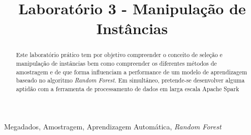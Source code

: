 \documentclass[conference]{IEEEtran}
\begin{document}
\title{Laboratório 3 - Manipulação de Instâncias}

\author{
\and
{}
\and
{}
}

\maketitle

\begin{abstract}
Este laboratório prático tem por objetivo compreender o conceito de seleção e manipulação de instâncias
bem como compreender os diferentes métodos de amostragem e de que forma influenciam a performance
de um modelo de aprendizagem baseado no algoritmo \textit{Random Forest}.
Em simultâneo, pretende-se desenvolver alguma aptidão com a ferramenta de processamento de dados em larga escala Apache Spark \cite{b1}
\end{abstract}

\begin{IEEEkeywords}
Megadados, Amostragem, Aprendizagem Automática, \textit{Random Forest}
\end{IEEEkeywords}
\end{document}
